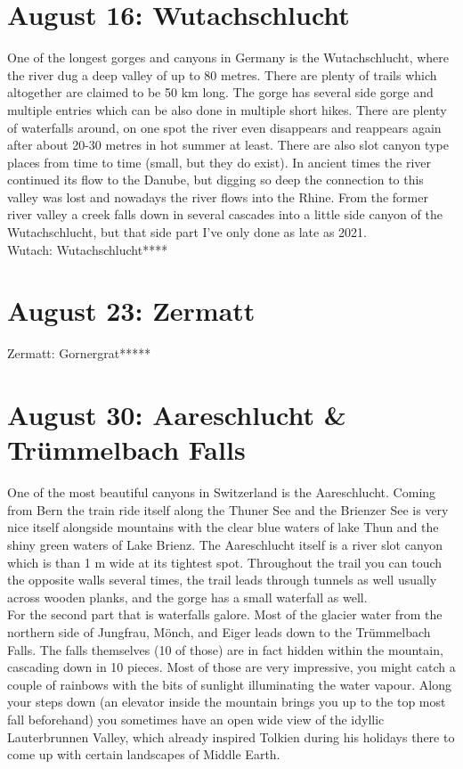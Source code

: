 \section{August 16: Wutachschlucht}
\label{2009:Wutachschlucht}

One of the longest gorges and canyons in Germany is the Wutachschlucht, where the river dug a deep valley of up to 80 metres. There are plenty of trails which altogether are claimed to be 50 km long. The gorge has several side gorge and multiple entries which can be also done in multiple short hikes. There are plenty of waterfalls around, on one spot the river even disappears and reappears again after about 20-30 metres in hot summer at least. There are also slot canyon type places from time to time (small, but they do exist). In ancient times the river continued its flow to the Danube, but digging so deep the connection to this valley was lost and nowadays the river flows into the Rhine. From the former river valley a creek falls down in several cascades into a little side canyon of the Wutachschlucht, but that side part I've only done as late as 2021.\\

Wutach: Wutachschlucht****

\section{August 23: Zermatt}
\label{2009:Zermatt}



Zermatt: Gornergrat*****

\section{August 30: Aareschlucht \& Tr\"ummelbach Falls}
\label{2009:Aareschlucht}

One of the most beautiful canyons in Switzerland is the Aareschlucht. Coming from Bern the train ride itself along the Thuner See and the Brienzer See is very nice itself alongside mountains with the clear blue waters of lake Thun and the shiny green waters of Lake Brienz. The Aareschlucht itself is a river slot canyon which is than 1 m wide at its tightest spot. Throughout the trail you can touch the opposite walls several times, the trail leads through tunnels as well usually across wooden planks, and the gorge has a small waterfall as well.\\

For the second part that is waterfalls galore. Most of the glacier water from the northern side of Jungfrau, M\"onch, and Eiger leads down to the Tr\"ummelbach Falls. The falls themselves (10 of those) are in fact hidden within the mountain, cascading down in 10 pieces. Most of those are very impressive, you might catch a couple of rainbows with the bits of sunlight illuminating the water vapour. Along your steps down (an elevator inside the mountain brings you up to the top most fall beforehand) you sometimes have an open wide view of the idyllic Lauterbrunnen Valley, which already inspired Tolkien during his holidays there to come up with certain landscapes of Middle Earth.\\


